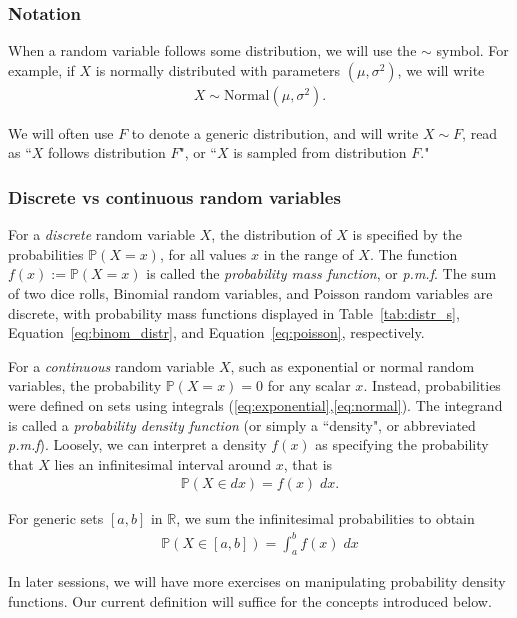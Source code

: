 \documentclass[11pt]{article}
\theoremstyle{definition}
\renewcommand{\P}{\mathbb{P}}
\newcommand{\R}{\mathbb{R}}
\begin{document}
\subsubsection*{Notation}

When a random variable follows some distribution,
we will use the $\sim$ symbol. For example,
if $X$ is normally distributed with parameters
$(\mu, \sigma^2)$, we will write
\begin{align*}
  X \sim \text{Normal}(\mu, \sigma^2).
\end{align*}

We will often use $F$ to denote a generic distribution,
and will write $X\sim F$, read as ``$X$ follows distribution $F$", or ``$X$ is sampled from distribution $F$."

\subsubsection*{Discrete vs continuous random variables}

For a \textit{discrete} random variable $X$, the distribution of $X$ is specified
by the probabilities $\P(X = x)$, for all values $x$ in the range of $X$.
The function $f(x) := \P(X = x)$ is called the \textit{probability mass function}, or \textit{p.m.f}.
The sum of two dice rolls, Binomial random variables, and Poisson random variables
are discrete, with probability mass functions displayed in
Table~\ref{tab:distr_s}, Equation~\eqref{eq:binom_distr},
and Equation~\eqref{eq:poisson}, respectively.

For a \textit{continuous} random variable $X$, such as exponential or normal random variables,
the probability $\P(X = x) = 0$ for any scalar $x$.  Instead, probabilities were defined on sets
using integrals (\ref{eq:exponential},\ref{eq:normal}).
The integrand is called a \textit{probability density function} (or simply a ``density", or abbreviated \textit{p.m.f}). Loosely,
we can interpret a density $f(x)$ as specifying the probability that $X$ lies
an infinitesimal interval around $x$, that is
\begin{align*}
  \P(X \in dx) = f(x)\;dx.
\end{align*}

For generic sets $[a, b]$ in $\R$, we sum the infinitesimal probabilities
to obtain
\begin{align*}
  \P(X\in[a, b]) = \int_a^b f(x)\;dx
\end{align*}

In later sessions, we will have more exercises on manipulating probability density functions.
Our current definition will suffice for the concepts introduced below.
\end{document}
